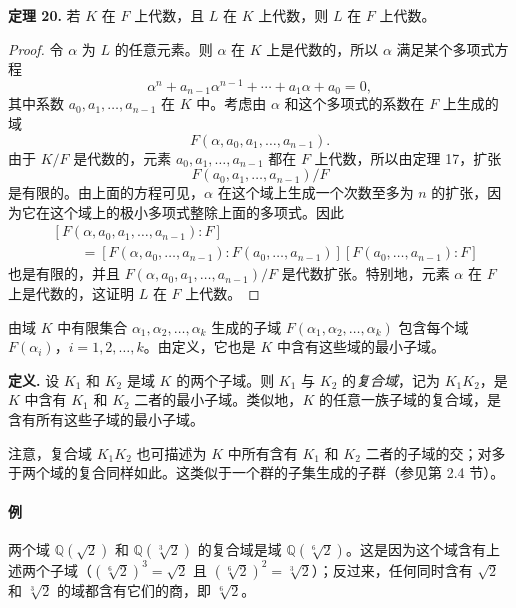 \noindent\textbf{定理 20.} 若 $K$ 在 $F$ 上代数，且 $L$ 在 $K$ 上代数，则 $L$ 在 $F$ 上代数。

\begin{proof}
	令 $\alpha$ 为 $L$ 的任意元素。则 $\alpha$ 在 $K$ 上是代数的，所以 $\alpha$ 满足某个多项式方程
	\[
	\alpha^n+a_{n-1}\alpha^{n-1}+\cdots+a_1\alpha+a_0=0,
	\]
	其中系数 $a_0,a_1,\ldots,a_{n-1}$ 在 $K$ 中。考虑由 $\alpha$ 和这个多项式的系数在 $F$ 上生成的域
	\[
	F(\alpha,a_0,a_1,\ldots,a_{n-1}).
	\]
	由于 $K/F$ 是代数的，元素 $a_0,a_1,\ldots,a_{n-1}$ 都在 $F$ 上代数，所以由定理 17，扩张
	\[
	F(a_0,a_1,\ldots,a_{n-1})/F
	\]
	是有限的。由上面的方程可见，$\alpha$ 在这个域上生成一个次数至多为 $n$ 的扩张，因为它在这个域上的极小多项式整除上面的多项式。因此
	\[
	\begin{aligned}
		&[F(\alpha,a_0,a_1,\ldots,a_{n-1}):F] \\
		&\qquad = [F(\alpha,a_0,\ldots,a_{n-1}):F(a_0,
		\ldots,a_{n-1})]
		[F(a_0,\ldots,a_{n-1}):F]
	\end{aligned}
	\]
	也是有限的，并且 $F(\alpha,a_0,a_1,\ldots,a_{n-1})/F$ 是代数扩张。特别地，元素 $\alpha$ 在 $F$ 上是代数的，这证明 $L$ 在 $F$ 上代数。
\end{proof}

由域 $K$ 中有限集合 $\alpha_1,\alpha_2,\ldots,\alpha_k$ 生成的子域 $F(\alpha_1,\alpha_2,\ldots,\alpha_k)$ 包含每个域 $F(\alpha_i)$，$i=1,2,\ldots,k$。由定义，它也是 $K$ 中含有这些域的最小子域。

\noindent\textbf{定义.} 设 $K_1$ 和 $K_2$ 是域 $K$ 的两个子域。则 $K_1$ 与 $K_2$ 的\emph{复合域}，记为 $K_1K_2$，是 $K$ 中含有 $K_1$ 和 $K_2$ 二者的最小子域。类似地，$K$ 的任意一族子域的复合域，是含有所有这些子域的最小子域。

注意，复合域 $K_1K_2$ 也可描述为 $K$ 中所有含有 $K_1$ 和 $K_2$ 二者的子域的交；对多于两个域的复合同样如此。这类似于一个群的子集生成的子群（参见第 2.4 节）。

\paragraph{例}
两个域 $\mathbb Q(\sqrt2)$ 和 $\mathbb Q(\sqrt[3]{2})$ 的复合域是域 $\mathbb Q(\sqrt[6]{2})$。这是因为这个域含有上述两个子域（$(\sqrt[6]{2})^3=\sqrt2$ 且 $(\sqrt[6]{2})^2=\sqrt[3]{2}$）；反过来，任何同时含有 $\sqrt2$ 和 $\sqrt[3]{2}$ 的域都含有它们的商，即 $\sqrt[6]{2}$。

